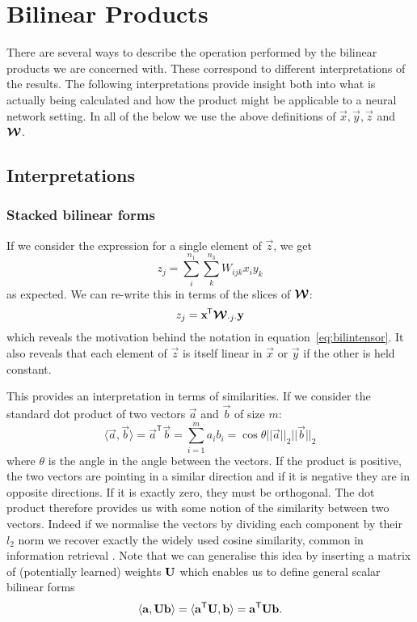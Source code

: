 \section{Bilinear Products}
There are several ways to describe the operation performed by the bilinear products we are
concerned with. These correspond to different interpretations of the results. The following
interpretations provide insight both into what is actually being calculated and how the product might
be applicable to a neural network setting. In all of the below we use the above definitions of
\(\vec{x}, \vec{y}, \vec{z}\) and \(\bm{\mathcal{W}}\).

\subsection{Interpretations}
\subsubsection{Stacked bilinear forms}
If we consider the expression for a single element of \(\vec{z}\), we get
\begin{equation} \label{eq:singlezsum}
	z_j = \sum_i^{n_1} \sum_k^{n_3} W_{ijk} x_i y_k
\end{equation} as expected. We can re-write this in terms of the slices of \(\bm{\mathcal{W}}\):
\begin{equation}\label{eq:singlezslice}
	z_j = \mathbf{x}^{\mkern-1.5mu\mathsf{T}}\bm{\mathcal{W}}_{\cdot j \cdot}\mathbf{y}
\end{equation} which reveals the motivation behind the notation in equation~\eqref{eq:bilintensor}.
It also reveals that each element of \(\vec{z}\) is itself linear in \(\vec{x}\) or \(\vec{y}\) if
the other is held constant.

This provides an interpretation
in terms of similarities. If we consider the standard dot product of two vectors 
\(\vec{a}\) and
\(\vec{b}\) of size \(m\): 
\begin{equation}
\langle\vec{a}, \vec{b}\rangle = 
\vec{a}^\mathsf{T}\vec{b}
= \sum_{i=1}^ma_ib_i
 = {\cos\theta}{||\vec{a}||_2||\vec{b}||_2} 
\end{equation} where
\(\theta\) is the angle in the angle between the vectors. If the product
is positive, the two vectors are pointing in a similar direction and if it is negative they
are in opposite directions. If it is exactly zero, they must be orthogonal. The dot product
therefore provides us with some notion of the similarity between two vectors.
Indeed if we normalise the vectors by dividing each component by their \(l_2\) norm we
recover exactly the widely used cosine similarity, common in information retrieval 
\autocite{Singhal2001, Tan2006} . Note that
we can generalise this idea by inserting a matrix of (potentially learned)
weights \(\mathbf{U}\) which enables us
to define general scalar bilinear forms
\begin{equation}
	\langle\mathbf{a}, \mathbf{U}\mathbf{b}\rangle = \langle\mathbf{a}^\mathsf{T}\mathbf{U}, \mathbf{b}\rangle
	= \mathbf{a}^\mathsf{T}\mathbf{U}\mathbf{b}.
\end{equation}


